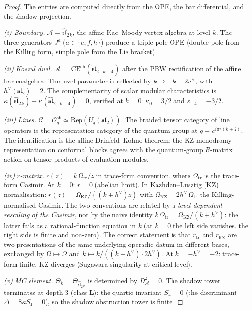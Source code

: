 \documentclass[11pt,reqno]{amsart}
\theoremstyle{definition}
\theoremstyle{remark}
\newcommand{\cA}{\mathcal{A}}
\newcommand{\cC}{\mathcal{C}}
\newcommand{\cO}{\mathcal{O}}
\newcommand{\Rep}{\mathrm{Rep}}
\newcommand{\fsl}{\mathfrak{sl}}
\numberwithin{equation}{section}
\begin{document}
\begin{proof}
The entries are computed directly from the OPE, the bar differential,
and the shadow projection.

\smallskip\noindent\emph{(i) Boundary.}\enspace
$\cA = \widehat{\fsl}_2{}_k$, the affine Kac--Moody vertex
algebra at level $k$. The three generators $J^a$
($a \in \{e, f, h\}$) produce a triple-pole OPE (double pole from
the Killing form, simple pole from the Lie bracket).

\smallskip\noindent\emph{(ii) Koszul dual.}\enspace
\(\cA^!=\mathrm{CE}^{\mathrm{ch}}(\widehat{\fsl}_2{}_{-k-4})\)
after the PBW rectification of the affine bar coalgebra. The level
parameter is reflected by
\(k\mapsto -k-2h^\vee\), with \(h^\vee(\fsl_2)=2\). The
complementarity of scalar modular characteristics is
$\kappa(\widehat{\fsl}_2{}_k) +
\kappa(\widehat{\fsl}_2{}_{-k-4}) = 0$,
verified at $k = 0$: $\kappa_0 = 3/2$ and $\kappa_{-4} = -3/2$.

\smallskip\noindent\emph{(iii) Lines.}\enspace
$\cC = \cO_q^{\mathrm{sh}} \simeq
\Rep(U_q(\fsl_2))$. The braided tensor category of line
operators is the representation category of the quantum group at
$q = e^{i\pi/(k+2)}$. The identification is the affine
Drinfeld--Kohno theorem: the KZ monodromy representation on
conformal blocks agrees with the quantum-group $R$-matrix action
on tensor products of evaluation modules.

\smallskip\noindent\emph{(iv) $r$-matrix.}\enspace
$r(z) = k\,\Omega_{\mathrm{tr}}/z$ in trace-form convention,
where $\Omega_{\mathrm{tr}}$ is the trace-form Casimir. At $k = 0$:
$r = 0$ (abelian limit). In Kazhdan--Lusztig (KZ) normalisation:
$r(z) = \Omega_{\mathrm{KZ}}/((k + h^\vee)z)$ with
$\Omega_{\mathrm{KZ}} = 2 h^\vee\, \Omega_{\mathrm{tr}}$ the
Killing-normalised Casimir. The two conventions are related by a
\emph{level-dependent rescaling of the Casimir}, not by the naive
identity $k\,\Omega_{\mathrm{tr}} = \Omega_{\mathrm{KZ}}/(k+h^\vee)$:
the latter fails as a rational-function equation in $k$ (at $k=0$
the left side vanishes, the right side is finite and non-zero).
The correct statement is that $r_{\mathrm{tr}}$ and $r_{\mathrm{KZ}}$
are two presentations of the same underlying operadic datum in
different bases, exchanged by $\Omega \mapsto \Omega$ and
$k \mapsto k/((k+h^\vee)\cdot 2 h^\vee)$. At $k = -h^\vee = -2$:
trace-form finite, KZ diverges (Sugawara singularity at critical level).

\smallskip\noindent\emph{(v) MC element.}\enspace
$\Theta_k = \Theta_{\widehat{\fsl}_2{}_k}$ is determined by
$D_{\cA}^2 = 0$. The shadow tower terminates at depth $3$
(class $\mathbf{L}$): the quartic invariant $S_4 = 0$
(the discriminant $\Delta = 8\kappa S_4 = 0$), so the shadow
obstruction tower is finite.


\end{proof}
\end{document}
